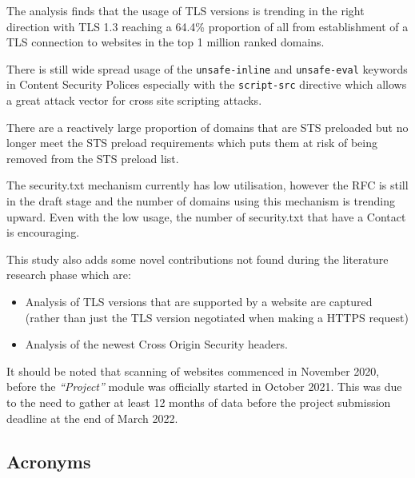 \documentclass{mscreport}
\begin{document}
\vspace{0.3cm} \noindent
The analysis finds that the usage of TLS versions is trending in the right direction with TLS 1.3 reaching a 64.4\% proportion of all from establishment of a TLS connection to websites in the top 1 million ranked domains.

\vspace{0.3cm} \noindent
There is still wide spread usage of the \texttt{unsafe-inline} and \texttt{unsafe-eval} keywords in Content Security Polices especially with the \texttt{script-src} directive which allows a great attack vector for cross site scripting attacks.

\vspace{0.3cm} \noindent
There are a reactively large proportion of domains that are STS preloaded but no longer meet the STS preload requirements which puts them at risk of being removed from the STS preload list.

\vspace{0.3cm} \noindent
The security.txt mechanism currently has low utilisation, however the RFC is still in the draft stage and the number of domains using this mechanism is trending upward. Even with the low usage, the number of security.txt that have a Contact is encouraging.

\vspace{0.3cm} \noindent
This study also adds some novel contributions not found during the literature research phase which are:
\begin{itemize}
	\setlength\itemsep{0.1em}
	\item Analysis of TLS versions that are supported by a website are captured (rather than just the TLS version negotiated when making a HTTPS request)
	\item Analysis of the newest Cross Origin Security headers.
\end{itemize}

\vspace{0.3cm} \noindent
It should be noted that scanning of websites commenced in November 2020, before the \textit{``Project''} module was officially started in October 2021. This was due to the need to gather at least 12 months of data before the project submission deadline at the end of March 2022.


\newpage
\begin{center}
\section*{Acronyms}
\end{center}
\end{document}
